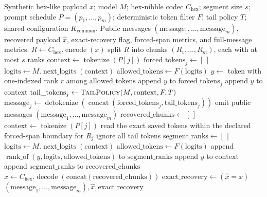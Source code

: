 \documentclass[fleqn,10pt]{wlscirep}
\newcommand{\RankOf}{\operatorname{rank\_of}}
\newcommand{\Encode}{\operatorname{encode}}
\newcommand{\Decode}{\operatorname{decode}}
\newcommand{\Tokenize}{\operatorname{tokenize}}
\newcommand{\Detokenize}{\operatorname{detokenize}}
\newcommand{\NextLogits}{\operatorname{next\_logits}}
\begin{document}
\begin{algorithm}[H]
\caption{Segmented multi-cover RankCloak trial for distributing a hex-nibble payload across payload-bearing forced spans with non-payload greedy continuations.}
\label{alg:segmented}
\begin{algorithmic}[1]
\Require Synthetic hex-like payload \(x\); model \(M\); hex-nibble codec \(C_{\mathrm{hex}}\); segment size \(s\); prompt schedule \(P=(p_1,\ldots,p_m)\); deterministic token filter \(F\); tail policy \(T\); shared configuration \(K_{\mathrm{common}}\).
\Ensure Public messages \((\mathrm{message}_1,\ldots,\mathrm{message}_m)\), recovered payload \(\hat{x}\), exact-recovery flag, forced-span metrics, and full-message metrics.
\State \(R \gets C_{\mathrm{hex}}.\Encode(x)\)
\State split \(R\) into chunks \((R_1,\ldots,R_m)\), each with at most \(s\) ranks
    \State \(\mathrm{context} \gets \Tokenize(P[j])\)
    \State \(\mathrm{forced\_tokens}_j \gets [\,]\)
        \State \(\mathrm{logits} \gets M.\NextLogits(\mathrm{context})\)
        \State \(\mathrm{allowed\_tokens} \gets F(\mathrm{logits})\)
        \State \(y \gets\) token with one-indexed rank \(r\) among \(\mathrm{allowed\_tokens}\)
        \State append \(y\) to \(\mathrm{forced\_tokens}_j\)
        \State append \(y\) to \(\mathrm{context}\)
    \EndFor
    \State \(\mathrm{tail\_tokens}_j \gets \Call{TailPolicy}{M,\mathrm{context},F,T}\)
    \State \(\mathrm{message}_j \gets \Detokenize(\operatorname{concat}(\mathrm{forced\_tokens}_j,\mathrm{tail\_tokens}_j))\)
\EndFor
\State emit public messages \((\mathrm{message}_1,\ldots,\mathrm{message}_m)\)
\Statex
\State \(\mathrm{recovered\_chunks} \gets [\,]\)
    \State \(\mathrm{context} \gets \Tokenize(P[j])\)
    \State read the exact saved tokens within the declared forced-span boundary for \(R_j\)
    \State ignore all tail tokens
    \State \(\mathrm{segment\_ranks} \gets [\,]\)
        \State \(\mathrm{logits} \gets M.\NextLogits(\mathrm{context})\)
        \State \(\mathrm{allowed\_tokens} \gets F(\mathrm{logits})\)
        \State append \(\RankOf(y,\mathrm{logits},\mathrm{allowed\_tokens})\) to \(\mathrm{segment\_ranks}\)
        \State append \(y\) to \(\mathrm{context}\)
    \EndFor
    \State append \(\mathrm{segment\_ranks}\) to \(\mathrm{recovered\_chunks}\)
\EndFor
\State \(\hat{x} \gets C_{\mathrm{hex}}.\Decode(\mathrm{concat}(\mathrm{recovered\_chunks}))\)
\State \(\mathrm{exact\_recovery} \gets (\hat{x}=x)\)
\State \Return \((\mathrm{message}_1,\ldots,\mathrm{message}_m),\hat{x},\mathrm{exact\_recovery}\)
\end{algorithmic}
\end{algorithm}
\end{document}
